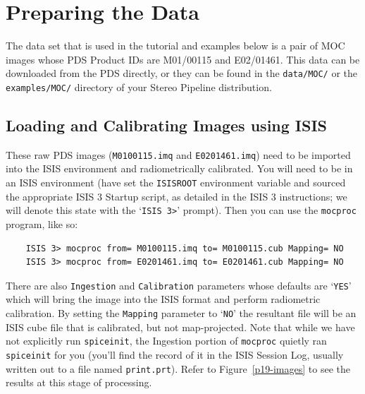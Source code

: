 \section{Preparing the Data}

The data set that is used in the tutorial and examples below is a
pair of \ac{MOC} \citep{1992JGR....97.7699M,2001JGR...10623429M}
images whose \ac{PDS} Product IDs are M01/00115 and E02/01461.
This data can be downloaded from the PDS directly, or they can be
found in the \texttt{data/MOC/} or the \texttt{examples/MOC/}
directory of your Stereo Pipeline distribution.

\subsection{Loading and Calibrating Images using ISIS}

These raw \ac{PDS} images (\texttt{M0100115.imq} and \texttt{E0201461.imq})
need to be imported into the \ac{ISIS} environment and radiometrically
calibrated.  You will need to be in an \ac{ISIS} environment (have
set the \texttt{ISISROOT} environment variable and sourced the
appropriate \ac{ISIS} 3 Startup script, as detailed in the \ac{ISIS}
3 instructions; we will denote this state with the `\texttt{ISIS
3>}' prompt).  Then you can use the \texttt{mocproc} program, like
so:

\begin{verbatim}
    ISIS 3> mocproc from= M0100115.imq to= M0100115.cub Mapping= NO
    ISIS 3> mocproc from= E0201461.imq to= E0201461.cub Mapping= NO
\end{verbatim}

There are also \texttt{Ingestion} and \texttt{Calibration} parameters
whose defaults are `\texttt{YES}' which will bring the image into the
\ac{ISIS} format and perform radiometric calibration.  By setting the
\texttt{Mapping} parameter to `\texttt{NO}' the resultant file will be
an \ac{ISIS} cube file that is calibrated, but not map-projected.
Note that while we have not explicitly run \texttt{spiceinit}, the
Ingestion portion of \texttt{mocproc} quietly ran \texttt{spiceinit}
for you (you'll find the record of it in the \ac{ISIS} Session Log,
usually written out to a file named \texttt{print.prt}).  Refer to
Figure~\ref{p19-images} to see the results at this stage of
processing.

